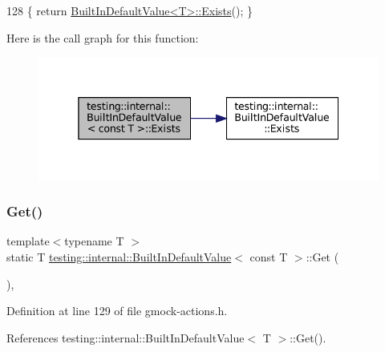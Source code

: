 \begin{DoxyCode}
128 \{ \textcolor{keywordflow}{return} \hyperlink{classtesting_1_1internal_1_1BuiltInDefaultValue_a35207bc20a493b0efb3980eb9a08dd2f}{BuiltInDefaultValue<T>::Exists}(); \}
\end{DoxyCode}
Here is the call graph for this function\+:
\nopagebreak
\begin{figure}[H]
\begin{center}
\leavevmode
\includegraphics[width=338pt]{classtesting_1_1internal_1_1BuiltInDefaultValue_3_01const_01T_01_4_a1814803ec5dcc660ee1f1092a96b79fa_cgraph}
\end{center}
\end{figure}
\mbox{\label{classtesting_1_1internal_1_1BuiltInDefaultValue_3_01const_01T_01_4_a5996754952ecbcc5da77a2cebd4722de}} 
\subsubsection{\texorpdfstring{Get()}{Get()}}
{\footnotesize\ttfamily template$<$typename T $>$ \\
static T \hyperlink{classtesting_1_1internal_1_1BuiltInDefaultValue}{testing\+::internal\+::\+Built\+In\+Default\+Value}$<$ const T $>$\+::Get (\begin{DoxyParamCaption}{ }\end{DoxyParamCaption})\hspace{0.3cm}{\ttfamily [inline]}, {\ttfamily [static]}}



Definition at line 129 of file gmock-\/actions.\+h.



References testing\+::internal\+::\+Built\+In\+Default\+Value$<$ T $>$\+::\+Get().


